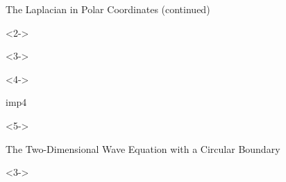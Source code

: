 \def\EMtitlesize{26}\def\EMtitleskip{31}
\begin{frame}{The Laplacian in Polar Coordinates (continued)}
\begin{uncoverenv}<2->
\end{uncoverenv}
\EMgap
\begin{uncoverenv}<3->
\end{uncoverenv}
\EMgap
\begin{uncoverenv}<4->
\end{uncoverenv}
\EMgap
\begin{EMbox}{imp}{4}{}
\begin{uncoverenv}<5->
\end{uncoverenv}
\end{EMbox}
\end{frame}

\def\EMtitlesize{26}\def\EMtitleskip{31}
\begin{frame}{The Two-Dimensional Wave Equation with a Circular Boundary}
\begin{minipage}[t]{500bp}\vspace{0pt}
\EMgap
\begin{uncoverenv}<3->
\end{uncoverenv}
\end{minipage}
\end{frame}

